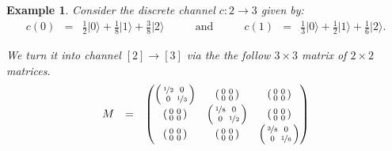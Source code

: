 \documentclass[leqno]{tufte-book} %
\newtheorem{example}[theorem]{Example}
\newcommand{\ket}[1]{\ensuremath{|#1\rangle}}
\begin{document}
\begin{example}
\label{ex:dqchannel}
Consider the discrete channel $c \colon 2 \rightarrow 3$ given by:
$$\begin{array}{rclcrcl}
c(0)
& = &
\frac{1}{2}\ket{0} + \frac{1}{8}\ket{1} + \frac{3}{8}\ket{2}
& \qquad\mbox{and}\qquad &
c(1)
& = &
\frac{1}{3}\ket{0} + \frac{1}{2}\ket{1} + \frac{1}{6}\ket{2}.
\end{array}$$

\noindent We turn it into channel $[2] \rightarrow [3]$ via the
the follow $3\times 3$ matrix of $2\times 2$ matrices.
$$\begin{array}{rcl}
M
& = &
\begin{pmatrix}
\left(\begin{smallmatrix} 
\nicefrac{1}{2} & 0 \\ 0 & \nicefrac{1}{3} 
\end{smallmatrix}\right)
&
\left(\begin{smallmatrix} 
0 & 0 \\ 0 & 0
\end{smallmatrix}\right)
&
\left(\begin{smallmatrix} 
0 & 0 \\ 0 & 0
\end{smallmatrix}\right)
\\
\left(\begin{smallmatrix} 
0 & 0 \\ 0 & 0
\end{smallmatrix}\right)
&
\left(\begin{smallmatrix} 
\nicefrac{1}{8} & 0 \\ 0 & \nicefrac{1}{2} 
\end{smallmatrix}\right)
&
\left(\begin{smallmatrix} 
0 & 0 \\ 0 & 0
\end{smallmatrix}\right)
\\
\left(\begin{smallmatrix} 
0 & 0 \\ 0 & 0
\end{smallmatrix}\right)
&
\left(\begin{smallmatrix} 
0 & 0 \\ 0 & 0
\end{smallmatrix}\right)
&
\left(\begin{smallmatrix} 
\nicefrac{3}{8} & 0 \\ 0 & \nicefrac{1}{6} 
\end{smallmatrix}\right)
\end{pmatrix}
\end{array}$$


\end{example}
\end{document}
